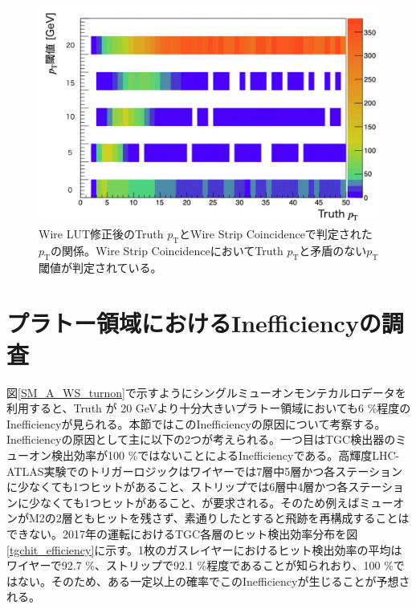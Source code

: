 \begin{figure} 
\centering
\includegraphics[width=16cm]{fig/Test/pt_after.png}
\caption[]{Wire LUT修正後のTruth $p_\mathrm{T}$とWire Strip Coincidenceで判定された$p_\mathrm{T}$の関係。Wire Strip CoincidenceにおいてTruth $p_\mathrm{T}$と矛盾のない$p_\mathrm{T}$ 閾値が判定されている。}
\label{pt_after}
\end{figure}


\clearpage
\section{プラトー領域におけるInefficiencyの調査}
\label{sec:appendix:plateau}
図\ref{SM_A_WS_turnon}で示すようにシングルミューオンモンテカルロデータを利用すると、Truth \pt が 20 GeVより十分大きいプラトー領域においても6 \%程度のInefficiencyが見られる。本節ではこのInefficiencyの原因について考察する。
Inefficiencyの原因として主に以下の2つが考えられる。一つ目はTGC検出器のミューオン検出効率が100 \%ではないことによるInefficiencyである。高輝度LHC-ATLAS実験でのトリガーロジックはワイヤーでは7層中5層かつ各ステーションに少なくても1つヒットがあること、ストリップでは6層中4層かつ各ステーションに少なくても1つヒットがあること、が要求される。そのため例えばミューオンがM2の2層ともヒットを残さず、素通りしたとすると飛跡を再構成することはできない。2017年の運転におけるTGC各層のヒット検出効率分布を図\ref{tgchit_efficiency}に示す。1枚のガスレイヤーにおけるヒット検出効率の平均はワイヤーで92.7 \%、ストリップで92.1 \%程度であることが知られおり、100 \%ではない。そのため、ある一定以上の確率でこのInefficiencyが生じることが予想される。

